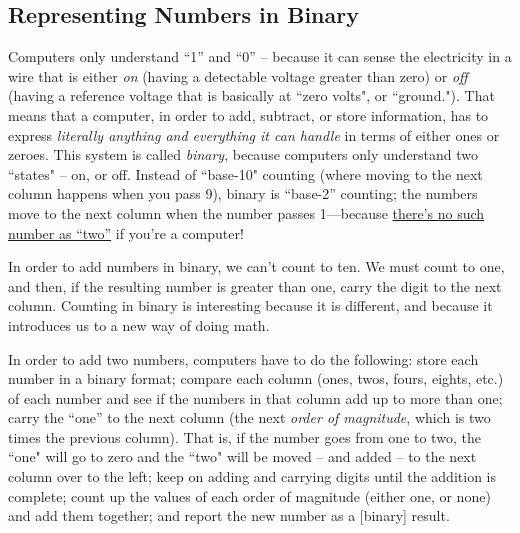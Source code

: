 \bigskip




\newpage
\subsection*{Representing Numbers in Binary}

Computers only understand ``1'' and ``0'' -- because it can sense the electricity in a wire that is either \emph{on} (having a detectable voltage greater than zero) or \emph{off} (having a reference voltage that is basically at ``zero volts", or ``ground."). That means that a computer, in order to add, subtract, or store information, has to express \emph{literally anything and everything it can handle} in terms of either ones or zeroes. This system is called \emph{binary}, because computers only understand two ``states" -- on, or off. Instead of ``base-10" counting (where moving to the next column happens when you pass 9), binary is ``base-2'' counting; the numbers move to the next column when the number passes 1---because {\color{webblue}\href{https://www.youtube.com/watch?v=MOn_ySghN2Y}{there's no such number as ``two''}} if you're a computer!

In order to add numbers in binary, we can't count to ten. We must count to one, and then, if the resulting number is greater than one, carry the digit to the next column. Counting in binary is interesting because it is different, and because it introduces us to a new way of doing math.

In order to add two numbers, computers have to do the following:
\be
\+ store each number in a binary format;
\+ compare each column (ones, twos, fours, eights, etc.) of each number and see if the numbers in that column add up to more than one;
\+ carry the ``one'' to the next column (the next \emph{order of magnitude}, which is two times the previous column). That is, if the number goes from one to two, the ``one" will go to zero and the ``two" will be moved -- and added -- to the next column over to the left;
\+ keep on adding and carrying digits until the addition is complete;
\+ count up the values of each order of magnitude (either one, or none) and add them together; and
\+ report the new number as a [binary] result.
\ee


